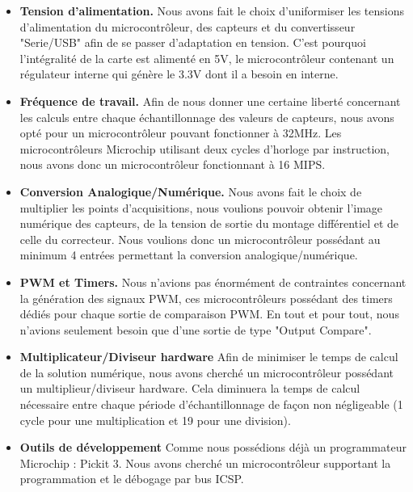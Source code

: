 \documentclass[11pt, french]{article} %
\begin{document}
\vspace{0.5cm}
\begin{itemize}
	\item \textbf{Tension d'alimentation.}
	Nous avons fait le choix d'uniformiser les tensions d'alimentation du microcontrôleur, des capteurs et du convertisseur "Serie/USB" afin de se passer d'adaptation en tension. C'est pourquoi l'intégralité de la carte est alimenté en 5V, le microcontrôleur contenant un régulateur interne qui génère le 3.3V dont il a besoin en interne.
\vspace{0.5cm}
	\item \textbf{Fréquence de travail.}
	Afin de nous donner une certaine liberté concernant les calculs entre chaque échantillonnage des valeurs de capteurs, nous avons opté pour un microcontrôleur pouvant fonctionner à 32MHz. Les microcontrôleurs Microchip utilisant deux cycles d'horloge par instruction, nous avons donc un microcontrôleur fonctionnant à 16 MIPS. 
\vspace{0.5cm}
	\item \textbf{Conversion Analogique/Numérique.}
 	Nous avons fait le choix de multiplier les points d'acquisitions, nous voulions pouvoir obtenir l'image numérique des capteurs, de la tension de sortie du montage différentiel et de celle du correcteur. Nous voulions donc un microcontrôleur possédant au minimum 4 entrées permettant la conversion analogique/numérique.
\vspace{0.5cm}
	\item \textbf{PWM et Timers.} 
	Nous n'avions pas énormément de contraintes concernant la génération des signaux PWM, ces microcontrôleurs possédant des timers dédiés pour chaque sortie de comparaison PWM. En tout et pour tout, nous n'avions seulement besoin que d'une sortie de type "Output Compare".
\vspace{0.5cm}
	\item \textbf{Multiplicateur/Diviseur hardware}
	Afin de minimiser le temps de calcul de la solution numérique, nous avons cherché un microcontrôleur possédant un multiplieur/diviseur hardware. Cela diminuera la temps de calcul nécessaire entre chaque période d'échantillonnage de façon non négligeable (1 cycle pour une multiplication et 19 pour une division).
\vspace{0.5cm}
	\item \textbf{Outils de développement}
	Comme nous possédions déjà un programmateur Microchip : Pickit 3. Nous avons cherché un microcontrôleur supportant la programmation et le débogage par bus ICSP.
\end{itemize}
\end{document}
